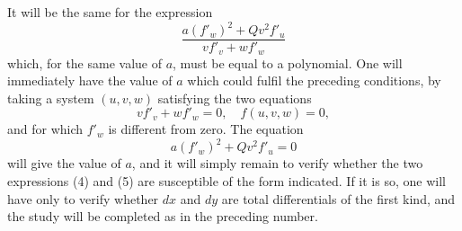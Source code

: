 \documentclass{article}
\begin{document}
It will be the same for the expression
\[
\frac{a (f'_{w})^{2} + Q v^{2} f'_{u}}{v f'_{v} + w f'_{w}} \tag{5}
\]
which, for the same value of $a$, must be equal to a polynomial. One will immediately have the value of $a$ which could fulfil the preceding conditions, by taking a system $(u, v, w)$ satisfying the two equations
\[
v f'_{v} + w f'_{w} = 0, \quad f(u, v, w) = 0,
\]
and for which $f'_{w}$ is different from zero. The equation
\[
a (f'_{w})^{2} + Q v^{2} f'_{u} = 0
\]
will give the value of $a$, and it will simply remain to verify whether the two expressions (4) and (5) are susceptible of the form indicated. If it is so, one will have only to verify whether $dx$ and $dy$ are total differentials of the first kind, and the study will be completed as in the preceding number.
\end{document}
